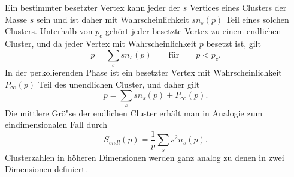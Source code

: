 Ein bestimmter besetzter Vertex kann jeder der $s$ Vertices eines Clusters der Masse $s$ sein und ist daher mit Wahrscheinlichkeit $sn_s(p)$ Teil eines solchen Clusters. Unterhalb von $p_c$ geh\"ort jeder besetzte Vertex zu einem endlichen Cluster, und da jeder Vertex mit Wahrscheinlichkeit $p$ besetzt ist, gilt
\begin{equation}
p=\sum_{s}sn_s(p) \qquad \text{f\"ur}\qquad p<p_c.
\end{equation}
In der perkolierenden Phase ist ein besetzter Vertex mit Wahrscheinlichkeit $P_\infty(p)$ Teil des unendlichen Cluster, und daher gilt
\begin{equation}
p=\sum_{s}sn_s(p)+P_\infty(p).
\end{equation}
Die mittlere Gr\"o"se der endlichen Cluster erh\"alt man in Analogie zum eindimensionalen Fall durch
 \begin{equation}
S_{endl}(p)=\frac{1}{p}\sum_{s}s^2n_s(p).
\end{equation}
Clusterzahlen in h\"oheren Dimensionen werden ganz analog zu denen in zwei Dimensionen definiert.

